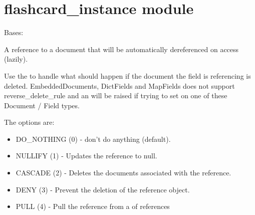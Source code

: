 \documentclass[letterpaper,10pt,english]{sphinxmanual}
\begin{document}
\chapter{flashcard\_instance module}
\label{\detokenize{flashcard_instance:module-flashcard_instance}}\label{\detokenize{flashcard_instance::doc}}\label{\detokenize{flashcard_instance:flashcard-instance-module}}

\begin{fulllineitems}
\label{\detokenize{flashcard_instance:flashcard_instance.FlashmapInstance}}
Bases: {\hyperref[\detokenize{flash_instance:flash_instance.FlashInstance}]{}}

\begin{fulllineitems}
\label{\detokenize{flashcard_instance:flashcard_instance.FlashmapInstance.reference}}
A reference to a document that will be automatically dereferenced on
access (lazily).

Use the  to handle what should happen if the document
the field is referencing is deleted.  EmbeddedDocuments, DictFields and
MapFields does not support reverse\_delete\_rule and an 
will be raised if trying to set on one of these Document / Field types.

The options are:
\begin{itemize}
\item {} 
DO\_NOTHING (0)  - don't do anything (default).

\item {} 
NULLIFY    (1)  - Updates the reference to null.

\item {} 
CASCADE    (2)  - Deletes the documents associated with the reference.

\item {} 
DENY       (3)  - Prevent the deletion of the reference object.

\item {} 
PULL       (4)  - Pull the reference from a  of references

\end{itemize}


\end{fulllineitems}
\end{fulllineitems}
\end{document}
